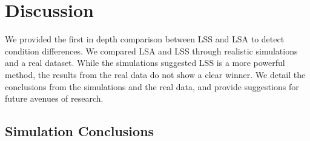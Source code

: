 \documentclass[10pt,letterpaper]{article}
\begin{document}



\section*{Discussion}
\label{discussion}

We provided the first in depth comparison between LSS and LSA to detect condition differences.
We compared LSA and LSS through realistic simulations and a real dataset.
While the simulations suggested LSS is a more powerful method,
the results from the real data do not show a clear winner.
We detail the conclusions from the simulations and the real data, and provide
suggestions for future avenues of research.

\subsection*{Simulation Conclusions}
\label{discussion:simulation-conclusions}
\end{document}
